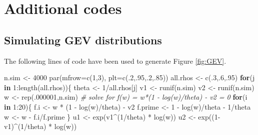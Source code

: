 \documentclass[
]{book}
\newenvironment{Shaded}{\begin{snugshade}}{\end{snugshade}}
\newcommand{\AttributeTok}[1]{\textcolor[rgb]{0.77,0.63,0.00}{#1}}
\newcommand{\CommentTok}[1]{\textcolor[rgb]{0.56,0.35,0.01}{\textit{#1}}}
\newcommand{\ControlFlowTok}[1]{\textcolor[rgb]{0.13,0.29,0.53}{\textbf{#1}}}
\newcommand{\DecValTok}[1]{\textcolor[rgb]{0.00,0.00,0.81}{#1}}
\newcommand{\FunctionTok}[1]{\textcolor[rgb]{0.00,0.00,0.00}{#1}}
\newcommand{\NormalTok}[1]{#1}
\newcommand{\OtherTok}[1]{\textcolor[rgb]{0.56,0.35,0.01}{#1}}
\newcommand{\SpecialCharTok}[1]{\textcolor[rgb]{0.00,0.00,0.00}{#1}}
\theoremstyle{definition}
\theoremstyle{definition}
\theoremstyle{definition}
\theoremstyle{definition}
\theoremstyle{remark}
\begin{document}
\hypertarget{additional-codes}{%
\section{Additional codes}\label{additional-codes}}

\hypertarget{App:GEV}{%
\subsection{Simulating GEV distributions}\label{App:GEV}}

The following lines of code have been used to generate Figure \ref{fig:GEV}.

\begin{Shaded}
\begin{Highlighting}[]
\NormalTok{n.sim }\OtherTok{\textless{}{-}} \DecValTok{4000}
\FunctionTok{par}\NormalTok{(}\AttributeTok{mfrow=}\FunctionTok{c}\NormalTok{(}\DecValTok{1}\NormalTok{,}\DecValTok{3}\NormalTok{),}
    \AttributeTok{plt=}\FunctionTok{c}\NormalTok{(.}\DecValTok{2}\NormalTok{,.}\DecValTok{95}\NormalTok{,.}\DecValTok{2}\NormalTok{,.}\DecValTok{85}\NormalTok{))}
\NormalTok{all.rhos }\OtherTok{\textless{}{-}} \FunctionTok{c}\NormalTok{(.}\DecValTok{3}\NormalTok{,.}\DecValTok{6}\NormalTok{,.}\DecValTok{95}\NormalTok{)}
\ControlFlowTok{for}\NormalTok{(j }\ControlFlowTok{in} \DecValTok{1}\SpecialCharTok{:}\FunctionTok{length}\NormalTok{(all.rhos))\{}
\NormalTok{  theta }\OtherTok{\textless{}{-}} \DecValTok{1}\SpecialCharTok{/}\NormalTok{all.rhos[j]}
\NormalTok{  v1 }\OtherTok{\textless{}{-}} \FunctionTok{runif}\NormalTok{(n.sim)}
\NormalTok{  v2 }\OtherTok{\textless{}{-}} \FunctionTok{runif}\NormalTok{(n.sim)}
\NormalTok{  w }\OtherTok{\textless{}{-}} \FunctionTok{rep}\NormalTok{(.}\DecValTok{000001}\NormalTok{,n.sim)}
  \CommentTok{\# solve for f(w) = w*(1 {-} log(w)/theta) {-} v2 = 0}
  \ControlFlowTok{for}\NormalTok{(i }\ControlFlowTok{in} \DecValTok{1}\SpecialCharTok{:}\DecValTok{20}\NormalTok{)\{}
\NormalTok{    f.i }\OtherTok{\textless{}{-}}\NormalTok{ w }\SpecialCharTok{*}\NormalTok{ (}\DecValTok{1} \SpecialCharTok{{-}} \FunctionTok{log}\NormalTok{(w)}\SpecialCharTok{/}\NormalTok{theta) }\SpecialCharTok{{-}}\NormalTok{ v2}
\NormalTok{    f.prime }\OtherTok{\textless{}{-}} \DecValTok{1} \SpecialCharTok{{-}} \FunctionTok{log}\NormalTok{(w)}\SpecialCharTok{/}\NormalTok{theta }\SpecialCharTok{{-}} \DecValTok{1}\SpecialCharTok{/}\NormalTok{theta}
\NormalTok{    w }\OtherTok{\textless{}{-}}\NormalTok{ w }\SpecialCharTok{{-}}\NormalTok{ f.i}\SpecialCharTok{/}\NormalTok{f.prime}
\NormalTok{  \}}
\NormalTok{  u1 }\OtherTok{\textless{}{-}} \FunctionTok{exp}\NormalTok{(v1}\SpecialCharTok{\^{}}\NormalTok{(}\DecValTok{1}\SpecialCharTok{/}\NormalTok{theta) }\SpecialCharTok{*} \FunctionTok{log}\NormalTok{(w))}
\NormalTok{  u2 }\OtherTok{\textless{}{-}} \FunctionTok{exp}\NormalTok{((}\DecValTok{1}\SpecialCharTok{{-}}\NormalTok{v1)}\SpecialCharTok{\^{}}\NormalTok{(}\DecValTok{1}\SpecialCharTok{/}\NormalTok{theta) }\SpecialCharTok{*} \FunctionTok{log}\NormalTok{(w))}


\end{Highlighting}
\end{Shaded}
\end{document}
